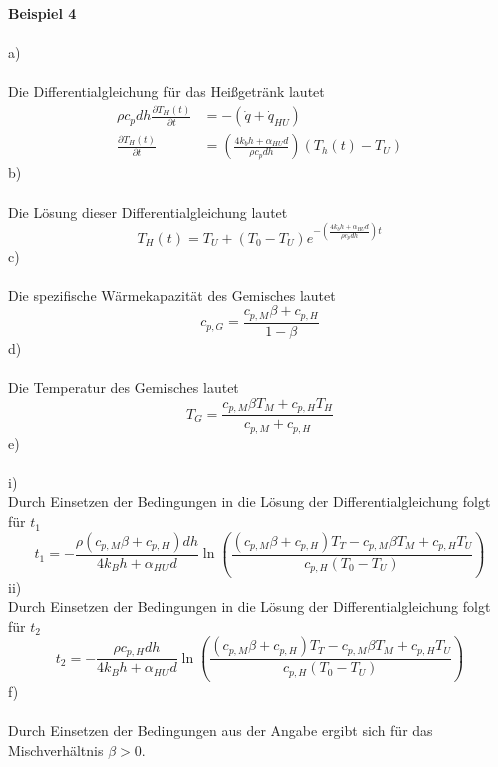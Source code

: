 \textbf{Beispiel 4}\\ \\
a)\\ \\
Die Differentialgleichung für das Heißgetränk lautet
\begin{align*}
	\rho c_p dh \frac{\partial T_H(t)}{\partial t} &= -(\dot{q} + \dot{q}_{HU}) \\
	\frac{\partial T_H(t)}{\partial t} &= \left(\frac{4k_bh + \alpha_{HU}d}{\rho c_p dh}\right)(T_h(t) - T_U)
\end{align*}
b)\\ \\
Die Lösung dieser Differentialgleichung lautet
\[
	T_H(t) = T_U + (T_0 - T_U)e^{-\left(\frac{4k_bh + \alpha_{HU}d}{\rho c_p dh}\right)t}
\]
c)\\ \\
Die spezifische Wärmekapazität des Gemisches lautet
\[
	c_{p,G} = \frac{c_{p,M}\beta + c_{p,H}}{1 - \beta}
\]
d) \\ \\
Die Temperatur des Gemisches lautet
\[
	T_G = \frac{c_{p,M}\beta T_M + c_{p,H}T_H}{c_{p,M} + c_{p,H}}
\]
e)\\ \\
i)\\
Durch Einsetzen der Bedingungen in die Lösung der Differentialgleichung folgt für $t_1$
\[
	t_1 = -\frac{\rho(c_{p,M}\beta + c_{p,H})dh}{4k_Bh + \alpha_{HU}d}\ln\left(\frac{(c_{p,M}\beta + c_{p,H})T_T - c_{p,M}\beta T_M + c_{p,H}T_U}{c_{p,H}(T_0 - T_U)}\right)
\]
ii)\\
Durch Einsetzen der Bedingungen in die Lösung der Differentialgleichung folgt für $t_2$
\[
	t_2 = -\frac{\rho c_{p,H}dh}{4k_Bh + \alpha_{HU}d}\ln\left(\frac{(c_{p,M}\beta + c_{p,H})T_T - c_{p,M}\beta T_M + c_{p,H}T_U}{c_{p,H}(T_0 - T_U)}\right)
\]
f)\\ \\
Durch Einsetzen der Bedingungen aus der Angabe ergibt sich für das Mischverhältnis $\beta > 0$.